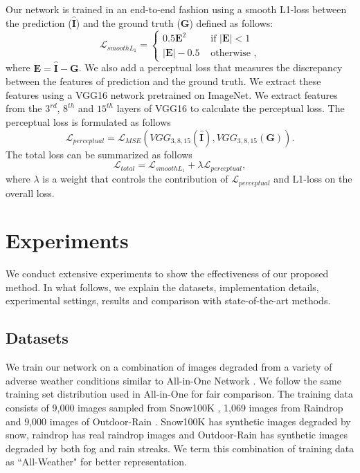 \documentclass[10pt,twocolumn,letterpaper]{article}
\begin{document}
Our network is trained in an end-to-end fashion using a smooth L1-loss between the prediction ($\hat{\textbf{I}}$) and the ground truth ($\textbf{G}$) defined as follows:
\begin{equation}
	\mathcal{L}_{smooth L_{1}}=\left\{\begin{array}{ll}
		0.5 \textbf{E}^{2} & \text { if }|\textbf{E}|<1 \\
		|\textbf{E}|-0.5 & \text { otherwise },
	\end{array}\right.
\end{equation}
where $\textbf{E} = \hat{\textbf{I}} - \textbf{G}$. We also add a perceptual loss that measures the discrepancy between the features of prediction and the ground truth. We extract these features using a VGG16 network \cite{simonyan2014very}  pretrained on ImageNet. We extract features from the $3^{rd}$, $8^{th}$ and $15^{th}$ layers of VGG16 to calculate the perceptual loss. The perceptual loss is formulated as  follows
\begin{equation}
	\nonumber     \mathcal{L}_{perceptual} = \mathcal{L}_{MSE}(VGG_{3,8,15}(\hat{\textbf{I}}),VGG_{3,8,15}(\textbf{G})).
\end{equation}
The total loss can be summarized as follows
\begin{equation}
	\mathcal{L}_{total} = \mathcal{L}_{smooth L_{1}} + \lambda \mathcal{L}_{perceptual},
\end{equation}
where $\lambda$ is a weight that controls the contribution of $\mathcal{L}_{perceptual}$  and L1-loss on the overall loss.



\section{Experiments}

We conduct extensive experiments to show the effectiveness of our proposed method. In what follows, we explain the datasets, implementation details, experimental settings,  results and comparison with state-of-the-art methods.


\subsection{Datasets}
We train our network on a combination of images degraded from a variety of adverse weather conditions similar to All-in-One Network \cite{li2020all}. We follow the same training set distribution used in All-in-One for fair comparison. The training data consists of 9,000 images sampled from Snow100K \cite{liu2018desnownet}, 1,069 images from Raindrop \cite{qian2018attentive} and 9,000 images of Outdoor-Rain \cite{li2019heavy}. Snow100K has synthetic images degraded by snow, raindrop has real raindrop images and Outdoor-Rain has synthetic images degraded by both fog and rain streaks. We term this combination of training data as ``All-Weather" for better representation.
\end{document}
